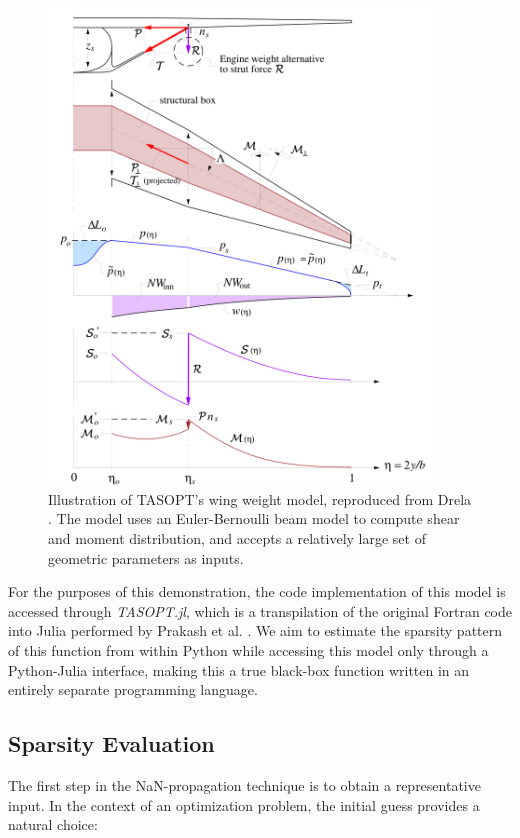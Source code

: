 \begin{figure}[H]
    \centering
    \includegraphics[width=4in]{../figures/nan-propagation/image1.png}
    \caption{Illustration of TASOPT's wing weight model, reproduced from Drela \cite{drela_tasopt_2010}. The model uses an Euler-Bernoulli beam model to compute shear and moment distribution, and accepts a relatively large set of geometric parameters as inputs.}
    \label{fig:nan-tasopt-wing-weight}
\end{figure}


For the purposes of this demonstration, the code implementation of this model is accessed through \emph{TASOPT.jl}, which is a transpilation of the original Fortran code into Julia performed by Prakash et al. \cite{tasopt_jl}. We aim to estimate the sparsity pattern of this function from within Python while accessing this model only through a Python-Julia interface, making this a true black-box function written in an entirely separate programming language.

\subsection{Sparsity Evaluation}

The first step in the NaN-propagation technique is to obtain a representative input. In the context of an optimization problem, the initial guess provides a natural choice:

